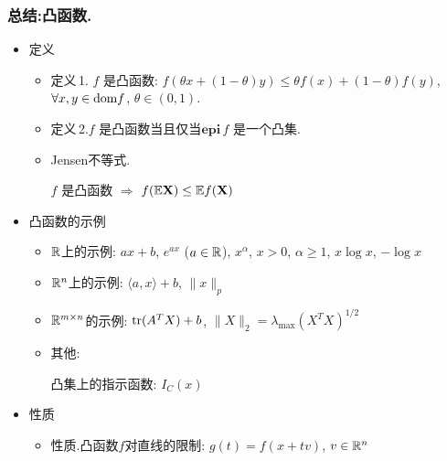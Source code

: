 \documentclass[handout,10pt]{beamer}
\begin{document}
\begin{frame}
	\frametitle{总结:凸函数.}
	
	\begin{itemize}
		\item 定义
		
		\begin{itemize}
			\item 定义\,1. \mystar $f$ 是凸函数:
			$f(\theta x + (1-\theta)y) \leq \theta f(x) + (1-\theta) f(y)$, $\forall x,y \in \textnormal{dom} f$, $\theta \in (0,1)$.
			
			
			\item  定义\,2.\mystar $f$ 是凸函数当且仅当$\mathbf{epi}\,f$ 是一个凸集.
			
			\item   Jensen不等式.
			
			$f$ 是凸函数 $\Rightarrow$ $f(\mathbb{E} \mathbf{X}) \leq \mathbb{E} f(\mathbf{X})$
		\end{itemize}
		
	\end{itemize}

	\begin{itemize}
		\item 凸函数的示例 \mystar
		
		\begin{itemize}
			\item $\mathbb{R}$上的示例: $ax+b$, $e^{ax}$ ($a\in \mathbb{R}$),
			$x^\alpha$, $x>0$, $\alpha\geq 1$, $x\log x$, $- \log x$
			
			\item  $\mathbb{R}^n$上的示例: $\langle a,x\rangle +b$, $\|x\|_p$
			
			\item $\mathbb{R}^{m\times n}$的示例: $\textnormal{tr}(A^TX)+b$, $\|X\|_2 = \lambda_{\max}^{}(X_{}^T X)^{1/2}$
			\item 其他:
			
			凸集上的指示函数: $ I_C(x)$
		\end{itemize}
	\end{itemize}

	\begin{itemize}
		
		\item 性质
		
		\begin{itemize}
			\item 性质.\mystar 凸函数$f$对直线的限制:
			$g(t) = f(x+tv)$, $v\in \mathbb{R}^n$
			
			
			
		\end{itemize}
	\end{itemize}

\end{frame}
\end{document}
